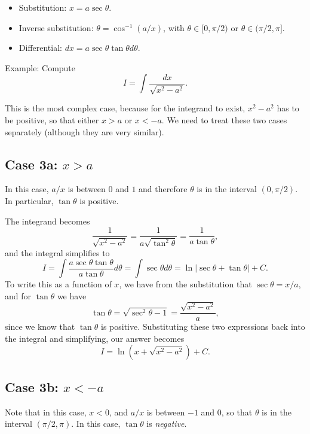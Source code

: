 \documentclass{article}
\begin{document}
\begin{itemize}
\item Substitution: $x = a \sec \theta$.
\item Inverse substitution: $\theta = \cos^{-1}(a/x)$, with $\theta \in [0, \pi/2)$ or $\theta \in (\pi/2, \pi]$.
\item Differential: $dx = a \sec \theta \tan \theta d\theta$.
\end{itemize}

Example: Compute
\[
  I = \int \frac{dx}{\sqrt{x^2 - a^2}}.
\]

This is the most complex case, because for the integrand to exist, $x^2 - a^2$ has to be positive, so that either $x > a$ or $x < -a$. We need to treat these two cases separately (although they are very similar).

\subsection*{Case 3a: $x > a$}

In this case, $a/x$ is between $0$ and $1$ and therefore $\theta$ is in the interval $(0, \pi/2)$. In particular, $\tan \theta$ is positive.

The integrand becomes
\[
  \frac{1}{\sqrt{x^2 - a^2}} = \frac{1}{a \sqrt{\tan^2 \theta}} = \frac{1}{a \tan \theta},
\]
and the integral simplifies to
\[
  I = \int \frac{a \sec \theta \tan \theta}{a \tan \theta} d \theta = \int \sec \theta d\theta = \ln \left| \sec \theta + \tan \theta \right| + C.
\]
To write this as a function of $x$, we have from the substitution that $\sec \theta = x/a$, and for $\tan \theta$ we have
\[
  \tan \theta = \sqrt{\sec^2 \theta - 1} = \frac{\sqrt{x^2 - a^2}}{a},
\]
since we know that $\tan \theta$ is positive. Substituting these two expressions back into the integral and simplifying, our answer becomes
\[
  I  = \ln \left( x + \sqrt{x^2 - a^2} \right) + C.
\]

\subsection*{Case 3b: $x < - a$}

Note that in this case, $x < 0$, and $a/x$ is between $-1$ and $0$, so that $\theta$ is in the interval $(\pi/2, \pi)$. In this case, $\tan \theta$ is \emph{negative}.
\end{document}
